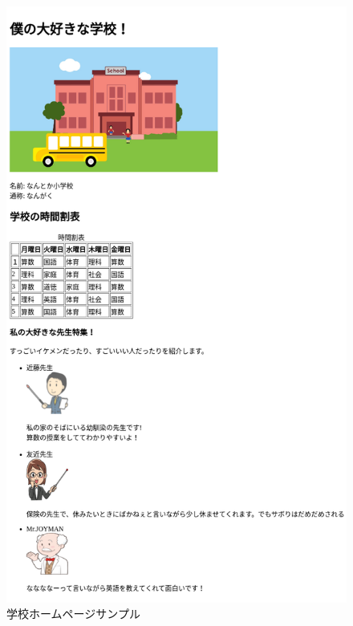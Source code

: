 \begin{figure}[h]
\begin{minipage}{0.45\textwidth}
{      \includegraphics[width=0.9\linewidth]{text01-img/textbook-img210.png}
      \caption{学校ホームページサンプル}\label{fig:49}
    }
  \end{minipage}


\end{figure}
